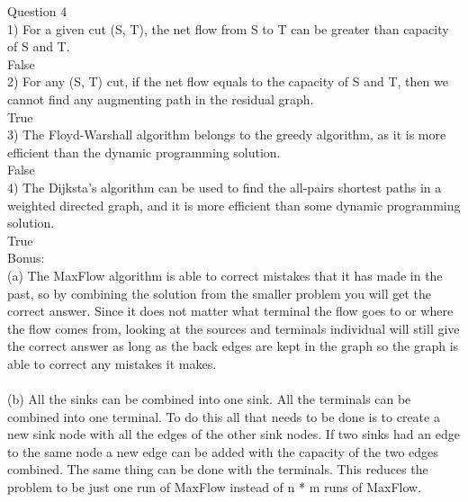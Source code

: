 \documentclass{article}
\begin{document}



Question 4\\
1) For a given cut (S, T), the net flow from S to T can be greater than capacity of S and T.\\
False\\
2) For any (S, T) cut, if the net flow equals to the capacity of S and T, then we cannot find any augmenting path in the residual graph.\\
True\\
3) The Floyd-Warshall algorithm belongs to the greedy algorithm, as it is more efficient than the dynamic programming solution.\\
False\\
4) The Dijksta's algorithm can be used to find the all-pairs shortest paths in a weighted directed graph, and it is more efficient than some dynamic programming solution.\\
True\\

Bonus:\\
(a) The MaxFlow algorithm is able to correct mistakes that it has made in the past, so by combining the solution from the smaller problem you will get the correct answer.
Since it does not matter what terminal the flow goes to or where the flow comes from, looking at the sources and terminals individual will still give the correct answer as long as the back edges are kept in the graph so the graph is able to correct any mistakes it makes. 
\\
\\
(b) All the sinks can be combined into one sink. 
All the terminals can be combined into one terminal. 
To do this all that needs to be done is to create a new sink node with all the edges of the other sink nodes.
If two sinks had an edge to the same node a new edge can be added with the capacity of the two edges combined.
The same thing can be done with the terminals. 
This reduces the problem to be just one run of MaxFlow instead of n * m runs of MaxFlow.
\end{document}
